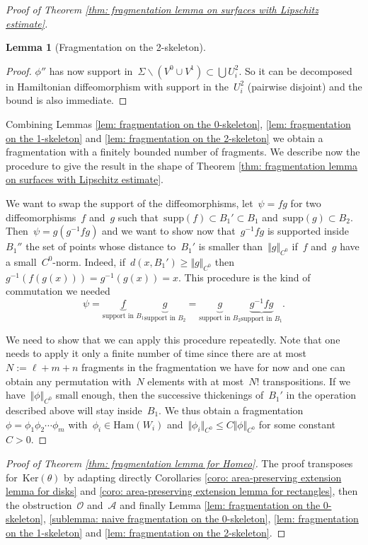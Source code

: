 \documentclass[10pt]{amsart}
\newtheorem{lemma}[prop]{Lemma}
\newcommand{\Ham}{\mathrm{Ham}}
\begin{document}
\begin{proof}[Proof of Theorem \ref{thm: fragmentation lemma on surfaces with Lipschitz estimate}]
\begin{lemma}[Fragmentation on the 2-skeleton]
\end{lemma}

\begin{proof}
$\phi''$ has now support in~$\Sigma \backslash (V^0 \cup V^1)\subset \bigcup U_i^{2}$. So it can be decomposed in Hamiltonian diffeomorphism with support in the~$U_i^2$ (pairwise disjoint) and the bound is also immediate.
\end{proof}

Combining Lemmas \ref{lem: fragmentation on the 0-skeleton}, \ref{lem: fragmentation on the 1-skeleton} and \ref{lem: fragmentation on the 2-skeleton} we obtain a fragmentation with a finitely bounded number of fragments. We describe now the procedure to give the result in the shape of Theorem \ref{thm: fragmentation lemma on surfaces with Lipschitz estimate}.

We want to swap the support of the diffeomorphisms, let~$\psi=fg$ for two diffeomorphisms~$f$ and~$g$ such that~$\text{supp}(f)\subset B_1'\subset B_1$ and~$\text{supp}(g)\subset B_2$. Then~$\psi=g(g^{-1}fg)$ and we want to show now that~$g^{-1}fg$ is supported inside~$B_1''$ the set of points whose distance to~$B_1'$ is smaller than~$\Vert g \Vert_{C^0}$ if~$f$ and~$g$ have a small~$C^0$-norm. Indeed, if~$d(x,B_1')\geq \Vert g\Vert_{C^0}$ then~$g^{-1}(f(g(x)))=g^{-1}(g(x))=x$. This procedure is the kind of commutation we needed
$$\psi=\underbrace{f}_{\text{support in } B_1}\underbrace{g}_{\text{support in } B_2}=\underbrace{g}_{\text{support in } B_2}\underbrace{g^{-1}fg}_{\text{support in } B_1}.$$

We need to show that we can apply this procedure repeatedly. Note that one needs to apply it only a finite number of time since there are at most~$N:=\ell+m+n$ fragments in the fragmentation we have for now and one can obtain any permutation with~$N$ elements with at most~$N!$ transpositions. If we have~$\Vert \phi \Vert_{C^0}$ small enough, then the successive thickenings of~$B_1'$ in the operation described above will stay inside~$B_1$. We thus obtain a fragmentation~$\phi=\phi_1 \phi_2\cdots \phi_m$ with~$\phi_i\in \Ham(W_i)$ and~$\Vert\phi_i\Vert_{C^0} \leq C \Vert\phi\Vert_{C^0}$ for some constant~$C>0$.

\end{proof}


\begin{proof}[Proof of Theorem \ref{thm: fragmentation lemma for Homeo}]
The proof transposes for~$\text{Ker}(\theta)$ by adapting directly Corollaries \ref{coro: area-preserving extension lemma for disks} and \ref{coro: area-preserving extension lemma for rectangles}, then the obstruction~$\mathcal{O}$ and~$\mathcal{A}$ and finally Lemma \ref{lem: fragmentation on the 0-skeleton}, \ref{sublemma: naive fragmentation on the 0-skeleton}, \ref{lem: fragmentation on the 1-skeleton} and \ref{lem: fragmentation on the 2-skeleton}.
\end{proof}
\end{document}
